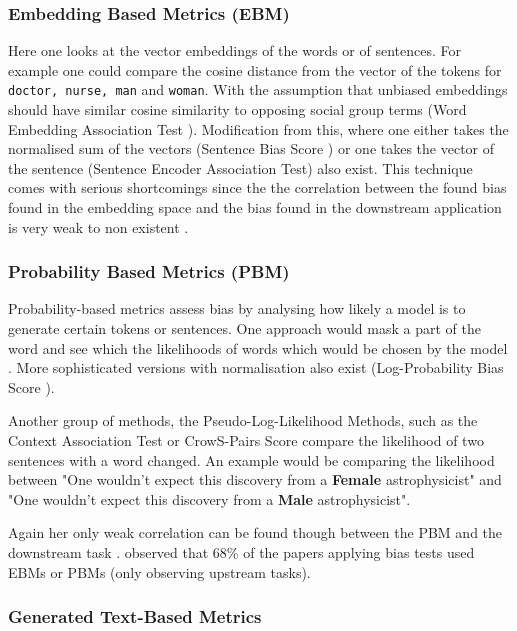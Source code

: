 \subsubsection{Embedding Based Metrics (EBM)}
Here one looks at the vector embeddings of the words or of sentences. For example one could compare the cosine distance from the vector of the tokens for \texttt{doctor, nurse, man} and \texttt{woman}. With the assumption that unbiased embeddings should have similar cosine similarity to opposing social group terms  (Word Embedding Association Test \citep{caliskan2017semantics}). Modification from this, where one either takes the normalised sum of the vectors (Sentence Bias Score \citep{dolci2023improving}) or one takes the vector of the sentence (Sentence Encoder Association Test\citep{may2019measuring}) also exist. This technique comes with serious shortcomings since the the correlation between the found bias found in the embedding space and the bias found in the downstream application is very weak to non existent \citep{goldfarb2021intrinsic,cao2021holistic}. 

\subsubsection{Probability Based Metrics (PBM)}
Probability-based metrics assess bias by analysing how likely a model is to generate certain tokens or sentences. One approach would mask a part of the word and see which the likelihoods of words which would be chosen by the model \citep{webster2020measuring}. More sophisticated versions with normalisation also exist (Log-Probability Bias Score \citep{kurita2019measuring}).

Another group of methods, the Pseudo-Log-Likelihood Methods, such as the Context Association Test or CrowS-Pairs Score compare the likelihood of two sentences with a word changed. An example would be comparing the likelihood between "One wouldn't expect this discovery from a \textbf{Female} astrophysicist" and "One wouldn't expect this discovery from a \textbf{Male} astrophysicist". 

Again her only weak correlation can be found though between the PBM and the downstream task \citep{kaneko2022debiasing, delobelle2022measuring}. \citet{goldfarb2023prompt} observed that 68\% of the papers applying bias tests used EBMs or PBMs (only observing upstream tasks).

\subsubsection{Generated Text-Based Metrics}
\label{subsubsec:generated-text-based-metrics}    



